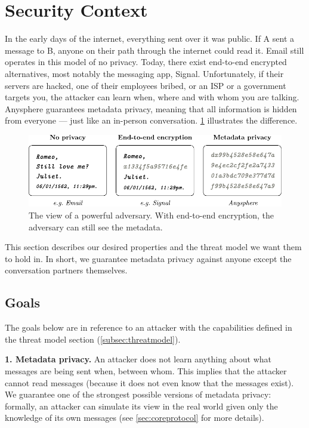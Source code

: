 \section{Security Context}
\label{sec:securitycontext}

In the early days of the internet, everything sent over it was public. If A sent a message to B, anyone on their path through the internet could read it. Email still operates in this model of no privacy. Today, there exist end-to-end encrypted alternatives, most notably the messaging app, Signal. Unfortunately, if their servers are hacked, one of their employees bribed, or an ISP or a government targets you, the attacker can learn when, where and with whom you are talking. Anysphere guarantees metadata privacy, meaning that all information is hidden from everyone — just like an in-person conversation. \cref{fig:metadataprivacy} illustrates the difference.

\begin{figure}[h!]
    \centering
        \includegraphics[width=\textwidth]{metadata-privacy.pdf}
\caption{The view of a powerful adversary. With end-to-end encryption, the adversary can still see the metadata.}
\label{fig:metadataprivacy}
\end{figure}

This section describes our desired properties and the threat model we want them to hold in. In short, we guarantee metadata privacy against anyone except the conversation partners themselves.

\subsection{Goals}

The goals below are in reference to an attacker with the capabilities defined in the threat model section (\cref{subsec:threatmodel}).

\textbf{1. Metadata privacy.} An attacker does not learn anything about what messages are being sent when, between whom. This implies that the attacker cannot read messages (because it does not even know that the messages exist). We guarantee one of the strongest possible versions of metadata privacy: formally, an attacker can simulate its view in the real world given only the knowledge of its own messages (see \cref{sec:coreprotocol} for more details).


